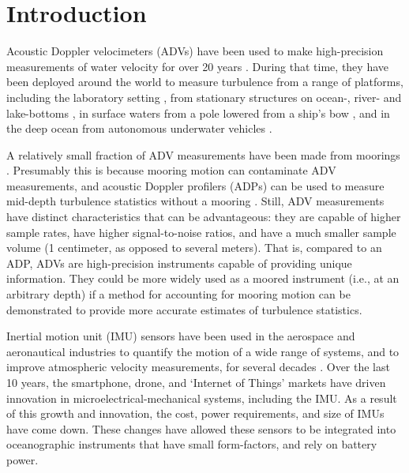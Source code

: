 
\section{Introduction}

Acoustic Doppler velocimeters (ADVs) have been used to make high-precision measurements of water velocity for over 20 years \cite[]{Kraus++1994, Lohrmann++1995}.  During that time, they have been deployed around the world to measure turbulence from a range of platforms, including the laboratory setting \cite[]{Voulgaris+Trowbridge1998}, from stationary structures on ocean-, river- and lake-bottoms \cite[]{Kim++2000, Lorke2007, Cartwright++2009}, in surface waters from a pole lowered from a ship's bow \cite[]{Geyer++2008}, and in the deep ocean from autonomous underwater vehicles \cite[e.g.,][]{Zhang++2001, Goodman++2006}. 


A relatively small fraction of ADV measurements have been made from moorings \cite[e.g.,][]{Fer+Paskyabi2014}. Presumably this is because mooring motion can contaminate ADV measurements, and acoustic Doppler profilers (ADPs) can be used to measure mid-depth turbulence statistics without a mooring \cite[e.g.,][]{Stacey++1999a, Rippeth++2002, Wiles++2006, Guerra+Thomson2017}. Still, ADV measurements have distinct characteristics that can be advantageous: they are capable of higher sample rates, have higher signal-to-noise ratios, and have a much smaller sample volume (1 centimeter, as opposed to several meters). That is, compared to an ADP, ADVs are high-precision instruments capable of providing unique information. They could be more widely used as a moored instrument (i.e., at an arbitrary depth) if a method for accounting for mooring motion can be demonstrated to provide more accurate estimates of turbulence statistics.

Inertial motion unit (IMU) sensors have been used in the aerospace and aeronautical industries to quantify the motion of a wide range of systems, and to improve atmospheric velocity measurements, for several decades \cite[]{Axford1968, Edson++1998, Bevly2004}. Over the last 10 years, the smartphone, drone, and `Internet of Things' markets have driven innovation in microelectrical-mechanical systems, including the IMU. As a result of this growth and innovation, the cost, power requirements, and size of IMUs have come down. These changes have allowed these sensors to be integrated into oceanographic instruments that have small form-factors, and rely on battery power.

